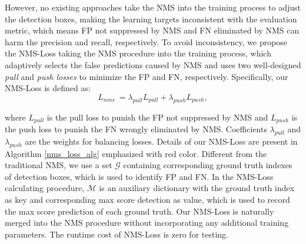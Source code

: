 \documentclass[sigconf]{acmart}
\begin{document}
However, no existing approaches take the NMS into the training process to adjust the detection boxes, making the learning targets inconsistent with the evaluation metric, which means FP not suppressed by NMS and FN eliminated by NMS can harm the precision and recall, respectively. To avoid inconsistency, we propose the NMS-Loss taking the NMS procedure into the training process, which adaptively selects the false predictions caused by NMS and uses two well-designed \emph{pull} and \emph{push losses} to minimize the FP and FN, respectively. Specifically, our NMS-Loss is defined as:
\begin{equation}
L_{nms}\ = \lambda_{pull}L_{pull} + \lambda_{push}L_{push},
\label{NMS_Loss}
\end{equation}

where $L_{pull}$ is the pull loss to punish the FP not suppressed by NMS and $L_{push}$ is the push loss to punish the FN wrongly eliminated by NMS. Coefficients $\lambda_{pull}$ and $\lambda_{push}$ are the weights for balancing losses. Details of our NMS-Loss are present in Algorithm \ref{nms_loss_alg} emphasized with red color. Different from the traditional NMS, we use a set $\mathcal{G}$ containing corresponding ground truth indexes of detection boxes, which is used to identify FP and FN. In the NMS-Loss calculating procedure, $\mathcal{M}$ is an auxiliary dictionary with the ground truth index as key and corresponding max score detection as value, which is used to record the max score prediction of each ground truth. Our NMS-Loss is naturally merged into the NMS procedure without incorporating any additional training parameters. The runtime cost of NMS-Loss is zero for testing.
\end{document}
